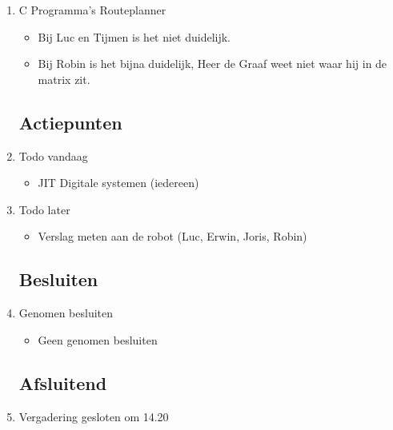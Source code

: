 \documentclass{article}
\begin{document}
\begin{enumerate}
	\item C Programma's Routeplanner
	\begin{itemize}
		\item Bij Luc en Tijmen is het niet duidelijk.
		\item Bij Robin is het bijna duidelijk, Heer de Graaf weet niet waar hij in de matrix zit.
	\end{itemize}

	\subsection*{Actiepunten}
	\item Todo vandaag
	\begin{itemize}
		\item JIT Digitale systemen (iedereen)
	\end{itemize}
	\item Todo later
	\begin{itemize}
		\item Verslag meten aan de robot (Luc, Erwin, Joris, Robin)
	\end{itemize}

	\subsection*{Besluiten}
	\item Genomen besluiten
	\begin{itemize}
		\item Geen genomen besluiten
	\end{itemize}

	\noindent 
	\subsection*{Afsluitend}
	\item Vergadering gesloten om 14.20%

\end{enumerate}
\end{document}
